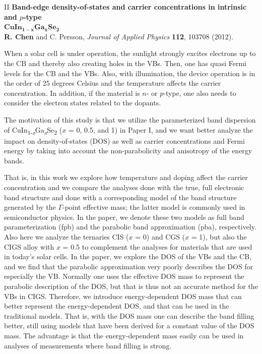 \documentclass[a4paper, 12pt, titlepage,oneside,drop]{kthesis}
\begin{document}
II \textbf{Band-edge density-of-states and carrier concentrations in intrinsic and $p$-type
\\$\mathbf {CuIn_{1-x}Ga_{x}Se_2}$}
\\\textbf{R. Chen} and C. Persson, \textit{Journal of Applied Physics} {\textbf {112}}, 103708 (2012).

\noindent 
When a solar cell is under operation, the sunlight  strongly excites electrons up to the CB and
thereby also creating holes in the VBs. Then, one has quasi Fermi levels for the CB and the VBs.  
Also, with illumination, the device operation is in the order of 25 degrees Celsius and the temperature 
affects the carrier concentration. 
In addition, if the material is $n$- or $p$-type, one also needs to consider the electron states related 
to the dopants.    

The motivation of this study is that we utilize the parameterized band dispersion of 
CuIn\textsubscript{1-\textit{x}}Ga\textsubscript{\textit{x}}Se\textsubscript{2} ($x$ = 0, 0.5, and 1) 
in Paper I, and we want 
better analyze the impact on density-of-states (DOS) as well as carrier concentrations and Fermi energy
by taking into account the non-parabolicity and anisotropy of the energy bands. 

 
That is, in this work we explore how temperature and doping affect the carrier concentration and we compare the 
analyses done with  the true, full electronic band structure and done with a corresponding model 
of the band structure generated 
by the $\Gamma$-point effective mass; the latter model is commonly used in semiconductor physics. 
In the paper, we denote these two models as full band parameterization (fpb) and the parabolic band approximation (pba), respectively.  
Also here we analyze the ternaries CIS ($x$ = 0) and CGS ($x$ = 1), but also the CIGS alloy with $x$ = 0.5 to complement the analyses for materials that are used in today's solar cells. 
In the paper, we explore the DOS of the VBs and the CB, and we find that the parabolic approximation very poorly describes the DOS for especially the VB. Normally one uses the effective DOS mass to represent 
the parabolic description of the DOS, but that is thus not an accurate method for the VBs in CIGS. Therefore, we introduce energy-dependent DOS mass that can better represent the energy-dependent DOS, and that can 
be used in the traditional models. That is, with the DOS mass one can describe the band filling better, still using models that have been derived for a constant value of the DOS mass. The advantage is that the energy-dependent 
mass easily can be used in analyses of measurements where band filling is strong.
\end{document}

